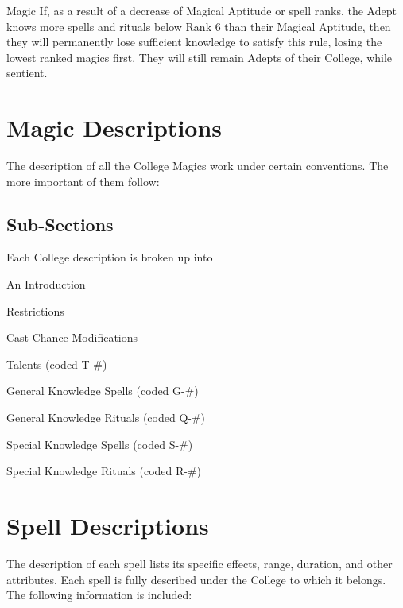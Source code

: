\begin{Chapter}{Magic}
If, as a result of a decrease of Magical Aptitude or spell ranks, the
Adept knows more spells and rituals below Rank 6 than their Magical
Aptitude, then they will permanently lose sufficient knowledge to
satisfy this rule, losing the lowest ranked magics first. They will
still remain Adepts of their College, while sentient.


\section{Magic Descriptions}
\label{magic:descriptions}

The description of all the College Magics work under certain
conventions.  The more important of them follow:

\subsection{Sub-Sections}

Each College description is broken up into  

\begin{Itemize}
  
\item An Introduction  

\item Restrictions  

\item Cast Chance Modifications  

\item Talents (coded T-\#)  

\item General Knowledge Spells (coded G-\#)  

\item General Knowledge Rituals (coded Q-\#)  

\item Special Knowledge Spells (coded S-\#)  

\item Special Knowledge Rituals (coded R-\#) 

\end{Itemize}


\section{Spell Descriptions}
\label{magic:spells}

The description of each spell lists its specific effects, range,
duration, and other attributes.  Each spell is fully described under
the College to which it belongs. The following information is
included:


\end{Chapter}
